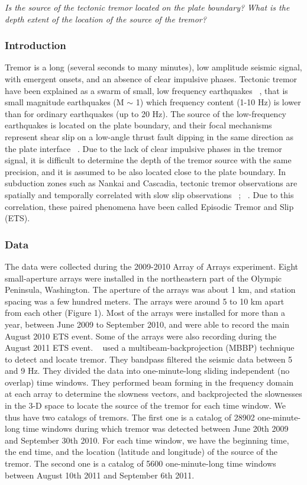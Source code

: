 \documentclass[letterpaper, 12pt]{article}
\begin{document}
\textit{Is the source of the tectonic tremor located on the plate boundary? What is the depth extent of the location of the source of the tremor?}

\subsubsection{Introduction}

Tremor is a long (several seconds to many minutes), low amplitude seismic signal, with emergent onsets, and an absence of clear impulsive phases. Tectonic tremor have been explained as a swarm of small, low frequency earthquakes ~\cite{SHE_2007_nature}, that is small magnitude earthquakes (M $\sim$ 1) which frequency content (1-10 Hz) is lower than for ordinary earthquakes (up to 20 Hz). The source of the low-frequency earthquakes is located on the plate boundary, and their focal mechanisms represent shear slip on a low-angle thrust fault dipping in the same direction as the plate interface ~\cite{IDE_2007_GRL}. Due to the lack of clear impulsive phases in the tremor signal, it is difficult to determine the depth of the tremor source with the same precision, and it is assumed to be also located close to the plate boundary. In subduction zones such as Nankai and Cascadia, tectonic tremor observations are spatially and temporally correlated with slow slip observations ~\cite{OBA_2002}; ~\cite{ROG_2003}. Due to this correlation, these paired phenomena have been called Episodic Tremor and Slip (ETS).

\subsubsection{Data}

The data were collected during the 2009-2010 Array of Arrays experiment. Eight small-aperture arrays were installed in the northeastern part of the Olympic Peninsula, Washington. The aperture of the arrays was about 1 km, and station spacing was a few hundred meters. The arrays were around 5 to 10 km apart from each other (Figure 1). Most of the arrays were installed for more than a year, between June 2009 to September 2010, and were able to record the main August 2010 ETS event. Some of the arrays were also recording during the August 2011 ETS event. ~\cite{GHO_2012} used a multibeam-backprojection (MBBP) technique to detect and locate tremor. They bandpass filtered the seismic data between 5 and 9 Hz. They divided the data into one-minute-long sliding independent (no overlap) time windows. They performed beam forming in the frequency domain at each array to determine the slowness vectors, and backprojected the slownesses in the 3-D space to locate the source of the tremor for each time window. We thus have two catalogs of tremors. The first one is a catalog of 28902 one-minute-long time windows during which tremor was detected between June 20th 2009 and September 30th 2010. For each time window, we have the beginning time, the end time, and the location (latitude and longitude) of the source of the tremor. The second one is a catalog of 5600 one-minute-long time windows between August 10th 2011 and September 6th 2011.
\end{document}
